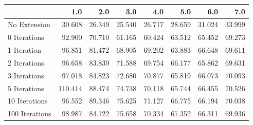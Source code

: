 \begin{tabular}{lrrrrrrr}
\toprule
{} &     1.0 &    2.0 &    3.0 &    4.0 &    5.0 &    6.0 &    7.0 \\
\midrule
No Extension   &  30.608 & 26.349 & 25.540 & 26.717 & 28.659 & 31.024 & 33.999 \\
0 Iterations   &  92.900 & 70.710 & 61.165 & 60.424 & 63.512 & 65.452 & 69.273 \\
1 Iteration    &  96.851 & 81.472 & 68.905 & 69.202 & 63.883 & 66.648 & 69.611 \\
2 Iterations   &  96.658 & 83.839 & 71.588 & 69.754 & 66.177 & 65.862 & 69.631 \\
3 Iterations   &  97.018 & 84.823 & 72.680 & 70.877 & 65.819 & 66.073 & 70.093 \\
5 Iterations   & 110.414 & 88.474 & 74.738 & 70.118 & 65.744 & 66.455 & 70.526 \\
10 Iterations  &  96.552 & 89.346 & 75.625 & 71.127 & 66.775 & 66.194 & 70.038 \\
100 Iterations &  98.987 & 84.122 & 75.658 & 70.334 & 67.352 & 66.311 & 69.936 \\
\bottomrule
\end{tabular}
